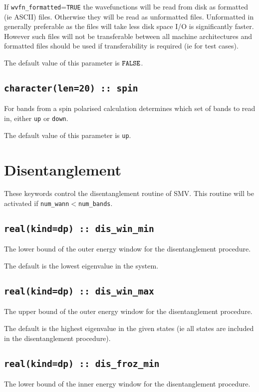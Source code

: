 If \verb#wvfn_formatted#=\verb#TRUE# the wavefunctions will be read from disk
as formatted (ie ASCII) files. Otherwise they will be read as unformatted
files. Unformatted in generally preferable as the files will take less disk
space  I/O is significantly faster. However such files
will not be transferable between all machine architectures and formatted
files should be used if transferability is required (ie for test cases).

The default value of this parameter is $\verb#FALSE#$.


\subsection[spin]{\tt character(len=20) :: spin}
For bands from a spin polarised calculation determines which set
of bands to read in, either \verb#up# or \verb#down#.

The default value of this parameter is \verb#up#.


\section{Disentanglement}
These keywords control the disentanglement routine of SMV. This routine
will be activated if \verb#num_wann#$<$\verb#num_bands#.


\subsection[dis\_win\_min]{\tt real(kind=dp) :: dis\_win\_min}
The lower bound of the outer energy window for the disentanglement
procedure.

The default is the lowest eigenvalue in the system.

\subsection[dis\_win\_max]{\tt real(kind=dp) :: dis\_win\_max}
The upper bound of the outer energy window for the disentanglement
procedure.

The default is the highest eigenvalue in the given states (ie all states
are included in the disentanglement procedure).

\subsection[dis\_froz\_min]{\tt real(kind=dp) :: dis\_froz\_min}
The lower bound of the inner energy window for the disentanglement
procedure. 

